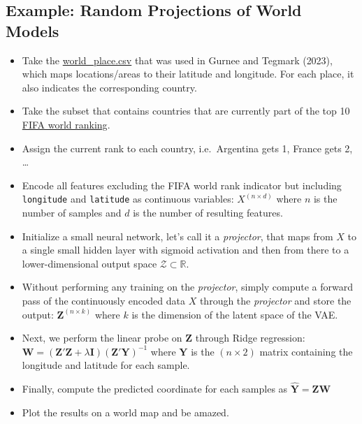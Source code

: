 \documentclass[
  letterpaper,
  DIV=11,
  numbers=noendperiod]{scrartcl}
\author{}
\date{}
\providecommand{\tightlist}{%
  \setlength{\itemsep}{0pt}\setlength{\parskip}{0pt}}\usepackage{longtable,booktabs,array}
\begin{document}
\ifdefined\Shaded\renewenvironment{Shaded}{\begin{tcolorbox}[frame hidden, interior hidden, sharp corners, boxrule=0pt, enhanced, borderline west={3pt}{0pt}{shadecolor}, breakable]}{\end{tcolorbox}}\fi

\hypertarget{example-random-projections-of-world-models}{%
\subsection{Example: Random Projections of World
Models}\label{example-random-projections-of-world-models}}

\begin{itemize}
\tightlist
\item
  Take the
  \href{https://github.com/wesg52/world-models/blob/main/data/entity_datasets/world_place.csv}{world\_place.csv}
  that was used in Gurnee and Tegmark (2023), which maps locations/areas
  to their latitude and longitude. For each place, it also indicates the
  corresponding country.
\item
  Take the subset that contains countries that are currently part of the
  top 10
  \href{https://www.fifa.com/fifa-world-ranking/men?dateId=id14142}{FIFA
  world ranking}.
\item
  Assign the current rank to each country, i.e.~Argentina gets 1, France
  gets 2, \ldots{}
\item
  Encode all features excluding the FIFA world rank indicator but
  including \texttt{longitude} and \texttt{latitude} as continuous
  variables: \(X^{(n \times d)}\) where \(n\) is the number of samples
  and \(d\) is the number of resulting features.
\item
  Initialize a small neural network, let's call it a \emph{projector},
  that maps from \(X\) to a single small hidden layer with sigmoid
  activation and then from there to a lower-dimensional output space
  \(\mathcal{Z} \subset \mathbb{R}\).
\item
  Without performing any training on the \emph{projector}, simply
  compute a forward pass of the continuously encoded data \(X\) through
  the \emph{projector} and store the output:
  \(\mathbf{Z}^{(n \times k)}\) where \(k\) is the dimension of the
  latent space of the VAE.
\item
  Next, we perform the linear probe on \(\mathbf{Z}\) through Ridge
  regression:
  \(\mathbf{W} = (\mathbf{Z}'\mathbf{Z} + \lambda \mathbf{I}) (\mathbf{Z}'\mathbf{Y})^{-1}\)
  where \(\mathbf{Y}\) is the \((n \times 2)\) matrix containing the
  longitude and latitude for each sample.
\item
  Finally, compute the predicted coordinate for each samples as
  \(\widehat{\mathbf{Y}}=\mathbf{Z}\mathbf{W}\)
\item
  Plot the results on a world map and be amazed.
\end{itemize}
\end{document}
